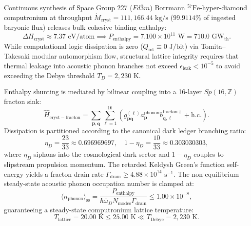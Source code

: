 \documentclass[11pt,onecolumn]{article}
\begin{document}
Continuous synthesis of Space Group 227 ($Fd\bar{3}m$) Borrmann $^{57}\text{Fe}$-hyper-diamond computronium at throughput $\dot{M}_{\text{cryst}} = 111{,}166.44\text{ kg/s}$ ($99.9114\%$ of ingested baryonic flux) releases bulk cohesive binding enthalpy:
\begin{equation}
\Delta H_{\mathrm{cryst}} \approx 7.37\text{ eV/atom} \implies P_{\mathrm{enthalpy}} = 7.100 \times 10^{11}\text{ W} = 710.0\text{ GW}_{\text{th}}.
\label{eq:condensation_enthalpy_release}
\end{equation}
While computational logic dissipation is zero ($Q_{\text{int}} \equiv 0\text{ J/bit}$) via Tomita--Takesaki modular automorphism flow, structural lattice integrity requires that thermal leakage into acoustic phonon branches not exceed $\epsilon_{\text{leak}} < 10^{-5}$ to avoid exceeding the Debye threshold $T_D = 2{,}230\text{ K}$.

Enthalpy shunting is mediated by bilinear coupling into a 16-layer $Sp(16, \mathbb{Z})$ fracton sink:
\begin{equation}
\hat{H}_{\mathrm{cryst-fracton}} = \sum_{\mathbf{p}, \mathbf{q}} \sum_{\ell=1}^{16} \left( g_{\mathbf{p}\mathbf{q}}^{(\ell)} a_{\mathbf{p}}^{\mathrm{phonon}} b_{\mathbf{q}, \ell}^{\mathrm{fracton}\dagger} + \mathrm{h.c.} \right).
\label{eq:fracton_hamiltonian}
\end{equation}
Dissipation is partitioned according to the canonical dark ledger branching ratio:
\begin{equation}
\eta_D = \frac{23}{33} \approx 0.696969697, \quad 1 - \eta_D = \frac{10}{33} \approx 0.303030303,
\label{eq:dark_ledger_branching}
\end{equation}
where $\eta_D$ siphons into the cosmological dark sector and $1 - \eta_D$ couples to slipstream propulsion momentum. The retarded Keldysh Green's function self-energy yields a fracton drain rate $\Gamma_{\text{drain}} \ge 4.88 \times 10^{14}\text{ s}^{-1}$. The non-equilibrium steady-state acoustic phonon occupation number is clamped at:
\begin{equation}
\langle n_{\mathrm{phonon}} \rangle_{\mathrm{ss}} = \frac{P_{\mathrm{enthalpy}}}{\hbar \bar{\omega}_D N_{\mathrm{modes}} \Gamma_{\mathrm{drain}}} \le 1.00 \times 10^{-8},
\label{eq:phonon_clamping_bound}
\end{equation}
guaranteeing a steady-state computronium lattice temperature:
\begin{equation}
T_{\mathrm{lattice}} = 20.00\text{ K} \le 25.00\text{ K} \ll T_{\mathrm{Debye}} = 2{,}230\text{ K}.
\label{eq:lattice_temp_limit}
\end{equation}
\end{document}
